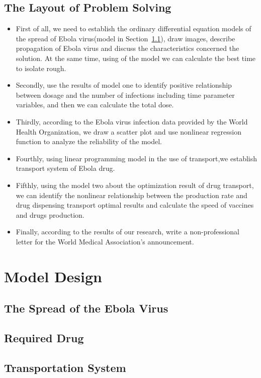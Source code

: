 \documentclass{icmmcm}
\begin{document}
\subsection{The Layout of Problem Solving}
\begin{itemize}
  \item First of all, we need to establish the ordinary
  differential equation models of the spread of Ebola
  virus(model in Section~\ref{sec:m1}), draw images, describe
  propagation of Ebola virus and discuss the characteristics
  concerned the solution. At the same time, using of the model
  we can calculate the best time to isolate rough.
  \item Secondly, use the results of model one to identify
  positive relationship between dosage and the number of
  infections including time parameter variables, and then we
  can calculate the total dose.
  \item Thirdly, according to the Ebola virus infection data provided
  by the World Health Organization, we draw a scatter plot and
  use nonlinear regression function to analyze the reliability
  of the model.
  \item Fourthly, using linear programming model in the use of
  transport,we establish transport system of Ebola drug.
  \item Fifthly, using the model two about the optimization result of
  drug transport, we can identify the nonlinear relationship
  between the production rate and drug dispensing transport
  optimal results and calculate the speed of vaccines and drugs
  production.
  \item Finally, according to the results of our research,
  write a non-professional letter for the World Medical
  Association's announcement.
\end{itemize}

\section{Model Design}
\subsection{The Spread of the Ebola Virus}
\label{sec:m1}

\subsection{Required Drug}

\subsection{Transportation System}

\end{document}

